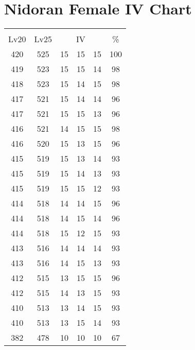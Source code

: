 \documentclass{article}%
\begin{document}
%
\normalsize%
\section{Nidoran Female IV Chart}%
\label{sec:Nidoran Female IV Chart}%
\renewcommand{\arraystretch}{1.5}%
\begin{tabular}{|c|c|c|c|c|c|}%
\hline%
\multicolumn{6}{|c|}{\textcolor{white}{ 
\linebreak{Nidoran Female}
}%
\cellcolor{black}}\\%
\multicolumn{1}{|c}{Lv20}&\multicolumn{1}{c|}{Lv25}&\multicolumn{3}{c|}{IV}&\multicolumn{1}{|c|}{\%}\\%
\hline%
\rowcolor{color100}%
420&525&15&15&15&100\\%
\hline%
\rowcolor{color98}%
419&523&15&15&14&98\\%
\hline%
\rowcolor{color98}%
418&523&15&14&15&98\\%
\hline%
\rowcolor{color96}%
417&521&15&14&14&96\\%
\hline%
\rowcolor{color96}%
417&521&15&15&13&96\\%
\hline%
\rowcolor{color98}%
416&521&14&15&15&98\\%
\hline%
\rowcolor{color96}%
416&520&15&13&15&96\\%
\hline%
\rowcolor{color93}%
415&519&15&13&14&93\\%
\hline%
\rowcolor{color93}%
415&519&15&14&13&93\\%
\hline%
\rowcolor{color93}%
415&519&15&15&12&93\\%
\hline%
\rowcolor{color96}%
414&518&14&14&15&96\\%
\hline%
\rowcolor{color96}%
414&518&14&15&14&96\\%
\hline%
\rowcolor{color93}%
414&518&15&12&15&93\\%
\hline%
\rowcolor{color93}%
413&516&14&14&14&93\\%
\hline%
\rowcolor{color93}%
413&516&14&15&13&93\\%
\hline%
\rowcolor{color96}%
412&515&13&15&15&96\\%
\hline%
\rowcolor{color93}%
412&515&14&13&15&93\\%
\hline%
\rowcolor{color93}%
410&513&13&14&15&93\\%
\hline%
\rowcolor{color93}%
410&513&13&15&14&93\\%
\hline%
\rowcolor{color91}%
382&478&10&10&10&67\\%
\end{tabular}

%
\end{document}
